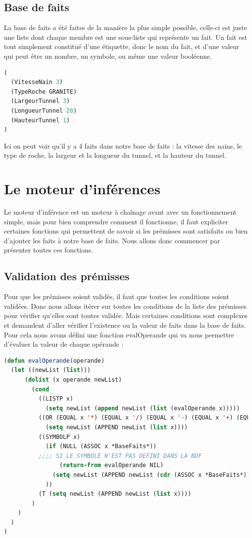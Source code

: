 \documentclass[a4paper,10pt]{report}
\begin{document}
    \subsection{Base de faits}
      La base de faits a été faites de la manière la plus simple possible, celle-ci est juste une liste dont chaque membre est une sous-liste qui représente un fait.
      Un fait est tout simplement constitué d'une étiquette, donc le nom du fait, et d'une valeur qui peut être un nombre, un symbole, ou même une valeur booléenne.
      \begin{lstlisting}[language=Lisp]
(
  (VitesseNain 3)
  (TypeRoche GRANITE)
  (LargeurTunnel 3)
  (LongueurTunnel 28)
  (HauteurTunnel 1)
)
      \end{lstlisting}
      Ici on peut voir qu'il y a 4 faits dans notre base de faits : la vitesse des nains, le type de roche, la largeur et la longueur du tunnel, et la hauteur du tunnel.
  \section{Le moteur d'inférences}
  Le moteur d'inférence est un moteur à chaînage avant avec un fonctionnement simple, mais pour bien comprendre comment il fonctionne, il faut expliciter certaines
  fonctions qui permettent de savoir si les prémisses sont satisfaits ou bien d'ajouter les faits à notre base de faits. Nous allons donc commencer par présenter
  toutes ces fonctions.\newpage
    \subsection{Validation des prémisses}
    Pour que les prémisses soient validés, il faut que toutes les conditions soient validées. Donc nous allons itérer sur toutes les conditions de la liste
    des prémisses pour vérifier qu'elles sont toutes validée. Mais certaines conditions sont complexes et demandent d'aller vérifier l'existence ou la valeur
    de faits dans la base de faits. Pour cela nous avons défini une fonction evalOperande qui va nous permettre d'évaluer la valeur de chaque opérande :
    \begin{lstlisting}[language=Lisp]
(defun evalOperande(operande)
  (let ((newList (list)))
      (dolist (x operande newList)
        (cond
          ((LISTP x)
            (setq newList (append newList (list (evalOperande x)))))
          ((OR (EQUAL x '*) (EQUAL x '/) (EQUAL x '-) (EQUAL x '+) (EQUAL x 'truncate))
            (setq newList (APPEND newList (list x))))
          ((SYMBOLP x)
            (if (NULL (ASSOC x *BaseFaits*))
	      ;;;; SI LE SYMBOLE N'EST PAS DEFINI DANS LA BDF
                (return-from evalOperande NIL) 
              (setq newList (APPEND newList (cdr (ASSOC x *BaseFaits*))))
            ))
          (T (setq newList (APPEND newList (list x))))
        )
    )
  )
)    
    \end{lstlisting}
\end{document}
